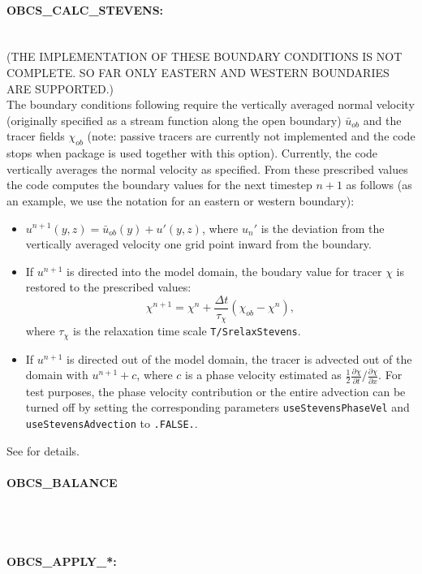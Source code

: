 \paragraph{OBCS\_CALC\_STEVENS:} ~ \\
(THE IMPLEMENTATION OF THESE BOUNDARY CONDITIONS IS NOT COMPLETE. SO
FAR ONLY EASTERN AND WESTERN BOUNDARIES ARE SUPPORTED.) \\
The boundary conditions following \citet{stevens:90} require the
vertically averaged normal velocity (originally specified as a stream
function along the open boundary) $\bar{u}_{ob}$ and the tracer fields
$\chi_{ob}$ (note: passive tracers are currently not implemented and
the code stops when package  is used together with this
option). Currently, the code vertically averages the normal velocity
as specified. From these prescribed values the code computes the
boundary values for the next timestep $n+1$ as follows (as an 
example, we use the notation for an eastern or western boundary):
\begin{itemize}
\item $u^{n+1}(y,z) = \bar{u}_{ob}(y) + u'(y,z)$, where $u_{n}'$ is the
  deviation from the vertically averaged velocity one grid point
  inward from the boundary.
\item If $u^{n+1}$ is directed into the model domain, the boudary
  value for tracer $\chi$ is restored to the prescribed values:
  \[\chi^{n+1} =   \chi^{n} + \frac{\Delta{t}}{\tau_\chi} (\chi_{ob} -
  \chi^{n}),\] where $\tau_\chi$ is the relaxation time
  scale \texttt{T/SrelaxStevens}.
\item If $u^{n+1}$ is directed out of the model domain, the tracer is
  advected out of the domain with $u^{n+1}+c$, where $c$ is a phase
  velocity estimated as
  $\frac{1}{2}\frac{\partial\chi}{\partial{t}}/\frac{\partial\chi}{\partial{x}}$.
  For test purposes, the phase velocity contribution or the entire
  advection can
  be turned off by setting the corresponding parameters
  \texttt{useStevensPhaseVel} and \texttt{useStevensAdvection} to
  \texttt{.FALSE.}.\end{itemize} See \citet{stevens:90} for details.

\paragraph{OBCS\_BALANCE} ~ \\
%
~

\paragraph{OBCS\_APPLY\_*:} ~ \\
~


